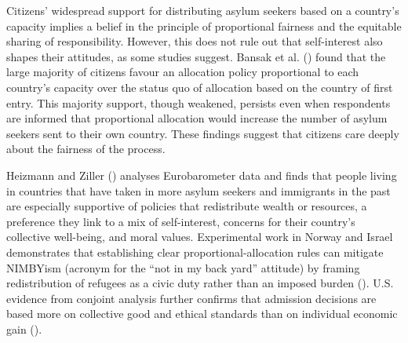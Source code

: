 \documentclass[
  12pt,
  a4paper,
]{article}
\begin{document}
Citizens' widespread support for distributing asylum seekers based on a country's capacity implies a belief in the principle of proportional fairness and the equitable sharing of responsibility. However, this does not rule out that self-interest also shapes their attitudes, as some studies suggest. Bansak et al. () found that the large majority of citizens favour an allocation policy proportional to each country's capacity over the status quo of allocation based on the country of first entry. This majority support, though weakened, persists even when respondents are informed that proportional allocation would increase the number of asylum seekers sent to their own country. These findings suggest that citizens care deeply about the fairness of the process.

Heizmann and Ziller () analyses Eurobarometer data and finds that people living in countries that have taken in more asylum seekers and immigrants in the past are especially supportive of policies that redistribute wealth or resources, a preference they link to a mix of self-interest, concerns for their country's collective well-being, and moral values. Experimental work in Norway and Israel demonstrates that establishing clear proportional-allocation rules can mitigate NIMBYism (acronym for the ``not in my back yard'' attitude) by framing redistribution of refugees as a civic duty rather than an imposed burden (). U.S. evidence from conjoint analysis further confirms that admission decisions are based more on collective good and ethical standards than on individual economic gain ().
\end{document}
